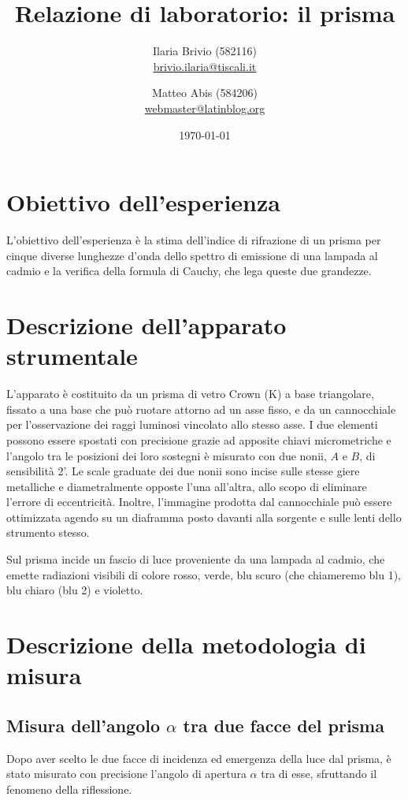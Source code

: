 \documentclass[italian,a4paper]{article}
\begin{document}
\title{Relazione di laboratorio: il prisma}
\author{\normalsize Ilaria Brivio (582116)\\%
\normalsize \url{brivio.ilaria@tiscali.it}%
\and %
\normalsize Matteo Abis (584206)\\ %
\normalsize \url{webmaster@latinblog.org}}
\date{\today}
\maketitle
\section{Obiettivo dell'esperienza}
L'obiettivo dell'esperienza è la stima dell'indice di rifrazione di un prisma per cinque diverse lunghezze d'onda dello spettro di emissione di una lampada al cadmio e la verifica della formula di Cauchy, che lega queste due grandezze.
\section{Descrizione dell'apparato strumentale}
L'apparato è costituito da un prisma di vetro Crown (K) a base triangolare, fissato a una base che può ruotare attorno ad un asse fisso, e da un cannocchiale per l'osservazione dei raggi luminosi vincolato allo stesso asse. I due elementi possono essere spostati con precisione grazie ad apposite chiavi micrometriche e l'angolo tra le  posizioni dei loro sostegni è misurato con due nonii, $A$ e $B$, di sensibilità 2'. Le scale graduate dei due nonii sono incise sulle stesse giere metalliche e diametralmente opposte l'una all'altra, allo scopo di eliminare l'errore di eccentricità. Inoltre, l'immagine prodotta dal cannocchiale può essere ottimizzata agendo su un diaframma posto davanti alla sorgente e sulle lenti dello strumento stesso.


Sul prisma incide un fascio di luce proveniente da una lampada al cadmio, che emette radiazioni visibili di colore rosso, verde, blu scuro (che chiameremo blu 1), blu chiaro (blu 2) e violetto. 
\section{Descrizione della metodologia di misura}
\subsection*{Misura dell'angolo $\alpha$ tra due facce del prisma}
Dopo aver scelto le due facce di incidenza ed emergenza della luce dal prisma, è stato misurato con precisione l'angolo di apertura $\alpha$ tra di esse, sfruttando il fenomeno della riflessione.
\end{document}
